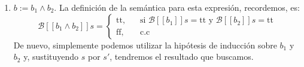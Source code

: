 \begin{sol}
\begin{demo}
\begin{itemize}
\begin{enumerate}
                \item $\boxed{b := b_1 \land b_2}$. La definición de la
                    semántica para esta expresión, recordemos, es:
                    \[
                        \mathcal{B}[[b_1 \land b_2]]s = \begin{cases}
                            \text{tt},\quad &\text{si } \mathcal{B}[[b_1]]s =
                            \text{tt y }\mathcal{B}[[b_2]]s = \text{tt}\\
                            \text{ff},\quad &\text{c.c}
                        \end{cases}
                    \]
                    De nuevo, simplemente podemos utilizar la hipótesis de
                    inducción sobre $b_1$ y $b_2$ y, sustituyendo $s$ por $s'$,
                    tendremos el resultado que buscamos.
            \end{enumerate}
        \end{itemize}
    \end{demo}
\end{sol}
